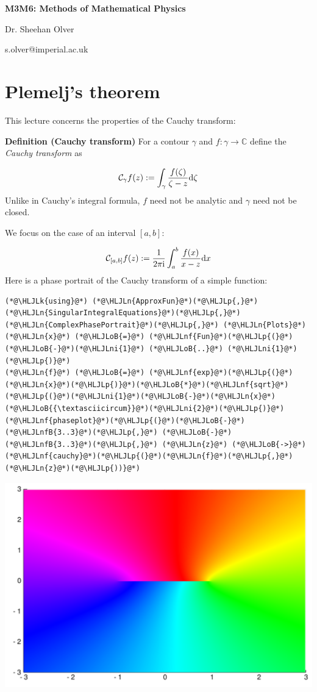 \documentclass[12pt,a4paper]{article}
\newcommand{\HLJLk}[1]{\textcolor[RGB]{148,91,176}{\textbf{#1}}}
\newcommand{\HLJLn}[1]{#1}
\newcommand{\HLJLnf}[1]{\textcolor[RGB]{66,102,213}{#1}}
\newcommand{\HLJLnfB}[1]{\textcolor[RGB]{59,151,46}{#1}}
\newcommand{\HLJLni}[1]{\textcolor[RGB]{59,151,46}{#1}}
\newcommand{\HLJLoB}[1]{\textcolor[RGB]{102,102,102}{\textbf{#1}}}
\newcommand{\HLJLp}[1]{#1}
\def\D{ {\rm d} }
\def\I{ {\rm i} }
\def\C{ {\mathbb C} }
\def\CC{ {\cal C} }
\def\dx{\D x}
\begin{document}
\textbf{M3M6: Methods of Mathematical Physics}

Dr. Sheehan Olver

s.olver@imperial.ac.uk

\section{Plemelj's theorem}
This lecture concerns the properties of the Cauchy transform:

\textbf{Definition (Cauchy transform)} For a contour $\gamma$ and $f : \gamma \rightarrow \C$ define the \emph{Cauchy transform} as

\[
\CC_\gamma f(z) := \int_\gamma {f(\zeta) \over \zeta - z} \D \zeta
\]
Unlike in Cauchy's integral formula, $f$ need not be analytic and $\gamma$ need not be closed.

We focus on the case of an interval $[a,b]$:

\[
\CC_{[a,b]} f(z) := {1 \over 2 \pi \I} \int_a^b {f(x) \over x - z} \dx
\]
Here is a phase portrait of the Cauchy transform of a simple function:


\begin{lstlisting}
(*@\HLJLk{using}@*) (*@\HLJLn{ApproxFun}@*)(*@\HLJLp{,}@*) (*@\HLJLn{SingularIntegralEquations}@*)(*@\HLJLp{,}@*) (*@\HLJLn{ComplexPhasePortrait}@*)(*@\HLJLp{,}@*) (*@\HLJLn{Plots}@*)
(*@\HLJLn{x}@*) (*@\HLJLoB{=}@*) (*@\HLJLnf{Fun}@*)(*@\HLJLp{(}@*)(*@\HLJLoB{-}@*)(*@\HLJLni{1}@*) (*@\HLJLoB{..}@*) (*@\HLJLni{1}@*)(*@\HLJLp{)}@*)
(*@\HLJLn{f}@*) (*@\HLJLoB{=}@*) (*@\HLJLnf{exp}@*)(*@\HLJLp{(}@*)(*@\HLJLn{x}@*)(*@\HLJLp{)}@*)(*@\HLJLoB{*}@*)(*@\HLJLnf{sqrt}@*)(*@\HLJLp{(}@*)(*@\HLJLni{1}@*)(*@\HLJLoB{-}@*)(*@\HLJLn{x}@*)(*@\HLJLoB{{\textasciicircum}}@*)(*@\HLJLni{2}@*)(*@\HLJLp{)}@*)
(*@\HLJLnf{phaseplot}@*)(*@\HLJLp{(}@*)(*@\HLJLoB{-}@*)(*@\HLJLnfB{3..3}@*)(*@\HLJLp{,}@*) (*@\HLJLoB{-}@*)(*@\HLJLnfB{3..3}@*)(*@\HLJLp{,}@*) (*@\HLJLn{z}@*) (*@\HLJLoB{->}@*) (*@\HLJLnf{cauchy}@*)(*@\HLJLp{(}@*)(*@\HLJLn{f}@*)(*@\HLJLp{,}@*)(*@\HLJLn{z}@*)(*@\HLJLp{))}@*)
\end{lstlisting}

\includegraphics[width=\linewidth]{figures/Lecture12_1_1.pdf}
\end{document}
